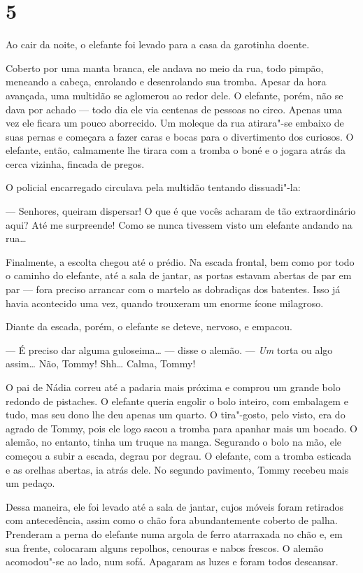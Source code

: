 \section{5}

Ao cair da noite, o elefante foi levado para a casa da garotinha doente.

Coberto por uma manta branca, ele andava no meio da rua, todo pimpão,
meneando a cabeça, enrolando e desenrolando sua tromba. Apesar da hora
avançada, uma multidão se aglomerou ao redor dele. O elefante, porém,
não se dava por achado --- todo dia ele via centenas de pessoas no
circo. Apenas uma vez ele ficara um pouco aborrecido. Um moleque da rua
atirara"-se embaixo de suas pernas e começara a fazer caras e bocas para
o divertimento dos curiosos. O elefante, então, calmamente lhe tirara
com a tromba o boné e o jogara atrás da cerca vizinha, fincada de
pregos.

O policial encarregado circulava pela multidão tentando dissuadi"-la:

--- Senhores, queiram dispersar! O que é que vocês acharam de tão
extraordinário aqui? Até me surpreende! Como se nunca tivessem visto um
elefante andando na rua\ldots{}

Finalmente, a escolta chegou até o prédio. Na escada frontal, bem como
por todo o caminho do elefante, até a sala de jantar, as portas estavam
abertas de par em par --- fora preciso arrancar com o martelo as
dobradiças dos batentes. Isso já havia acontecido uma vez, quando
trouxeram um enorme ícone milagroso.

Diante da escada, porém, o elefante se deteve, nervoso, e empacou.

--- É preciso dar alguma guloseima\ldots{} --- disse o alemão. --- \emph{Um}
torta ou algo assim\ldots{} Não, Tommy! Shh\ldots{} Calma, Tommy!

O pai de Nádia correu até a padaria mais próxima e comprou um grande
bolo redondo de pistaches. O elefante queria engolir o bolo inteiro, com
embalagem e tudo, mas seu dono lhe deu apenas um quarto. O tira"-gosto,
pelo visto, era do agrado de Tommy, pois ele logo sacou a tromba para
apanhar mais um bocado. O alemão, no entanto, tinha um truque na manga.
Segurando o bolo na mão, ele começou a subir a escada, degrau por
degrau. O elefante, com a tromba esticada e as orelhas abertas, ia atrás
dele. No segundo pavimento, Tommy recebeu mais um pedaço.

Dessa maneira, ele foi levado até a sala de jantar, cujos móveis foram
retirados com antecedência, assim como o chão fora abundantemente
coberto de palha. Prenderam a perna do elefante numa argola de ferro
atarraxada no chão e, em sua frente, colocaram alguns repolhos, cenouras
e nabos frescos. O alemão acomodou"-se ao lado, num sofá. Apagaram as
luzes e foram todos descansar.


